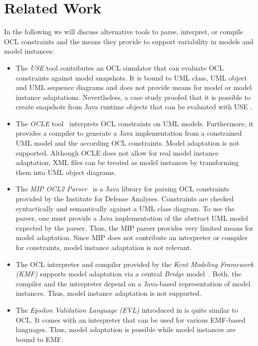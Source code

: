 \section{Related Work}
\label{sec:relatedWork}
In the following we will discuss alternative tools to parse,
interpret, or compile OCL constraints and the means they provide
to support variability in models and model instances:

\begin{itemize}
  
\item The \emph{USE} tool \cite{gogolla2007use} contributes an OCL simulator that can
evaluate OCL constraints against model snapshots. It is bound to UML class, UML object and
UML sequence diagrams and does not provide means for model or model instance
adaptations. Nevertheless, a case study proofed that it is possible to create snapshots
from Java runtime objects that can be evaluated with USE \cite{occello:ICSTW08}.

\item The \emph{OCLE} tool~\cite{WWW:OCLE} interprets OCL constraints on
UML models. Furthermore, it provides a compiler to generate a Java
implementation from a constrained UML model and the according OCL 
constraints. Model adaptation is not supported. Although OCLE does not allow for
real model instance adaptation, XML files can be treated as model instances by
transforming them into UML object diagrams.

\item The \emph{MIP OCL2 Parser}~\cite{WWW:MIP} is a Java library for parsing OCL
constraints provided by the Institute for Defense Analyses. Constraints are
checked syntactically and semantically against a UML class diagram.
To use the parser, one must provide a Java implementation of the abstract 
UML model expected by the parser. Thus,
the MIP parser provides very limited means for model adaptation. Since MIP does
not contribute an interpreter or compiler for constraints, model
instance adaptation is not relevant.

\item The OCL interpreter and compiler provided by the \emph{Kent Modeling Framework
(KMF)} supports model adaptation via a central \emph{Bridge}
model~\cite{akehurst2003ocl}. Both, the compiler and the interpreter depend on a
Java-based representation of model instances. Thus, model instance adaptation is not
supported.

\item The \emph{Epsilon Validation Language (EVL)} introduced in
\cite{kolovos2008detecting} is quite similar to OCL. It comes with an
interpreter that can be used for various EMF-based languages. Thus, model
adaptation is possible while model instances are bound to EMF.
 

\end{itemize}
